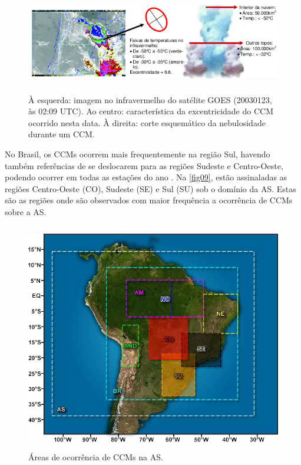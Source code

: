 \begin{figure}[!hbp]
\centering
\includegraphics[height=4.5cm]{./figs/fig08.png}
\caption{À esquerda: imagem no infravermelho do satélite GOES (20030123, às 02:09 UTC). Ao centro: característica da excentricidade do CCM ocorrido nesta data. À direita: corte esquemático da nebulosidade durante um CCM.}
\label{fig08}
\end{figure}

No Brasil, os CCMs ocorrem mais frequentemente na região Sul, havendo também referências de se deslocarem para as regiões Sudeste e Centro-Oeste, podendo ocorrer em todas as estações do ano \cite{silvadias96}. Na \autoref{fig09}, estão assinaladas as regiões Centro-Oeste (CO), Sudeste (SE) e Sul (SU) sob o domínio da AS. Estas são as regiões onde são observados com maior frequência a ocorrência de CCMs sobre a AS.

\begin{figure}[!hbp]
\centering
\includegraphics[height=10cm]{./figs/fig09.png}
\caption{Áreas de ocorrência de CCMs na AS.}
\label{fig09}
\end{figure}

